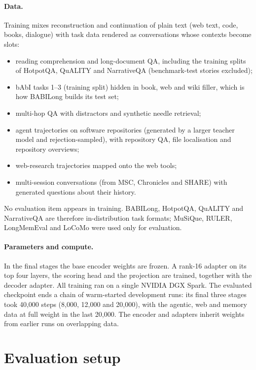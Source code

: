 \documentclass[11pt]{article}
\begin{document}
\paragraph{Data.}
Training mixes reconstruction and continuation of plain text (web text, code, books, dialogue) with
task data rendered as conversations whose contexts become slots:
\begin{itemize}
\item reading comprehension and long-document QA, including the training splits of HotpotQA, QuALITY
  and NarrativeQA (benchmark-test stories excluded);
\item bAbI tasks 1--3 (training split) hidden in book, web and wiki filler, which is how BABILong
  builds its test set;
\item multi-hop QA with distractors and synthetic needle retrieval;
\item agent trajectories on software repositories (generated by a larger teacher model and
  rejection-sampled), with repository QA, file localisation and repository overviews;
\item web-research trajectories mapped onto the web tools;
\item multi-session conversations (from MSC, Chronicles and SHARE) with generated questions about
  their history.
\end{itemize}
No evaluation item appears in training. BABILong, HotpotQA, QuALITY and NarrativeQA are therefore
in-distribution task formats; MuSiQue, RULER, LongMemEval and LoCoMo were used only for evaluation.

\paragraph{Parameters and compute.}
In the final stages the base encoder weights are frozen. A rank-16 adapter on its top four layers,
the scoring head and the projection are trained, together with the decoder adapter. All training ran
on a single NVIDIA DGX Spark. The evaluated checkpoint ends a chain of warm-started development runs:
its final three stages took 40{,}000 steps (8{,}000, 12{,}000 and 20{,}000), with the agentic, web
and memory data at full weight in the last 20{,}000. The encoder and adapters inherit weights from
earlier runs on overlapping data.

\section{Evaluation setup}
\label{sec:setup}
\end{document}
